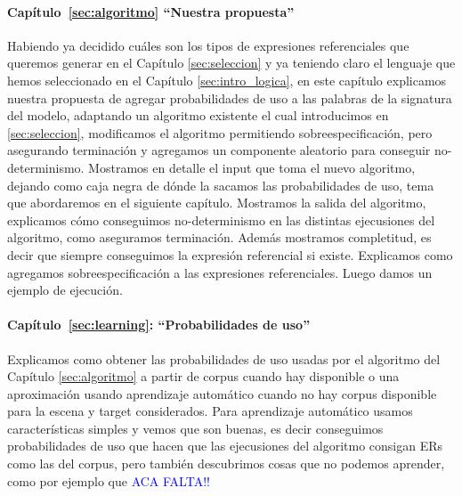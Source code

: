 \paragraph{Cap\'itulo~\ref{sec:algoritmo} ``Nuestra propuesta''} Habiendo ya decidido cu\'ales son los tipos de expresiones referenciales que queremos generar en el Cap\'itulo \ref{sec:seleccion} y ya teniendo
claro el lenguaje \EL que hemos seleccionado en el Cap\'itulo \ref{sec:intro_logica}, en este cap\'itulo 
explicamos nuestra propuesta de agregar probabilidades de uso a las palabras de la signatura del modelo, adaptando un algoritmo existente 
\cite{arec2:2008:Areces} el cual introducimos en \ref{sec:seleccion}, modificamos el algoritmo permitiendo sobreespecificaci\'on, 
pero asegurando terminaci\'on y agregamos un componente aleatorio para conseguir no-determinismo. Mostramos en detalle el input que toma el
 nuevo algoritmo, dejando como caja negra de d\'onde la sacamos las probabilidades de uso, tema que abordaremos en el siguiente cap\'itulo. 
Mostramos la salida del algoritmo, explicamos c\'omo conseguimos no-determinismo en las distintas ejecusiones del algoritmo, como aseguramos 
terminaci\'on. Adem\'as mostramos completitud, es decir que siempre conseguimos la expresi\'on referencial si existe. Explicamos como agregamos sobreespecificaci\'on a las expresiones referenciales. Luego damos un ejemplo de ejecuci\'on. 


\paragraph{Cap\'itulo~\ref{sec:learning}: ``Probabilidades de uso''} Explicamos como obtener las probabilidades de uso usadas por el algoritmo del Cap\'itulo \ref{sec:algoritmo} a partir de corpus cuando hay disponible o una aproximaci\'on usando aprendizaje autom\'atico cuando no hay corpus disponible para la escena y target considerados. Para aprendizaje autom\'atico usamos caracter\'isticas simples y vemos que son buenas, es decir conseguimos probabilidades de uso que hacen que las ejecusiones del algoritmo consigan ERs como las del corpus, pero tambi\'en descubrimos cosas que no podemos aprender, como por ejemplo que \textcolor{blue}{ACA FALTA!! }

